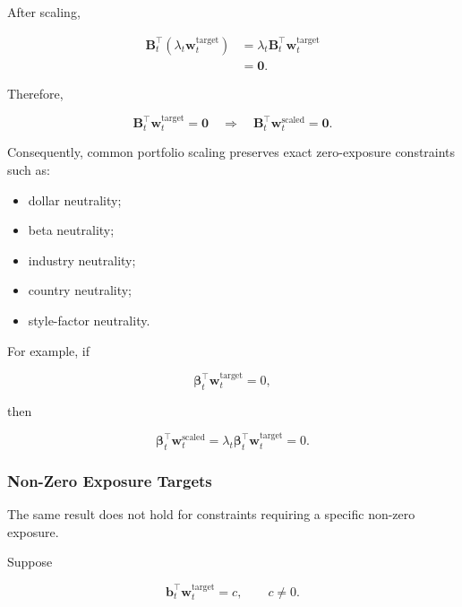 \documentclass[11pt,a4paper]{article}
\begin{document}
After scaling,

\begin{equation}
\begin{aligned}
\mathbf{B}_t^\top
\left(
\lambda_t
\mathbf{w}_t^{\mathrm{target}}
\right)
&=
\lambda_t
\mathbf{B}_t^\top
\mathbf{w}_t^{\mathrm{target}}
\\
&=
\mathbf{0}.
\end{aligned}
\end{equation}

Therefore,

\begin{equation}
\boxed{
\mathbf{B}_t^\top
\mathbf{w}_t^{\mathrm{target}}
=
\mathbf{0}
\quad\Rightarrow\quad
\mathbf{B}_t^\top
\mathbf{w}_t^{\mathrm{scaled}}
=
\mathbf{0}.
}
\end{equation}

Consequently, common portfolio scaling preserves exact zero-exposure
constraints such as:

\begin{itemize}
    \item dollar neutrality;
    \item beta neutrality;
    \item industry neutrality;
    \item country neutrality;
    \item style-factor neutrality.
\end{itemize}

For example, if

\begin{equation}
\boldsymbol{\beta}_t^\top
\mathbf{w}_t^{\mathrm{target}}
=
0,
\end{equation}

then

\begin{equation}
\boldsymbol{\beta}_t^\top
\mathbf{w}_t^{\mathrm{scaled}}
=
\lambda_t
\boldsymbol{\beta}_t^\top
\mathbf{w}_t^{\mathrm{target}}
=
0.
\end{equation}


\subsubsection{Non-Zero Exposure Targets}

The same result does not hold for constraints requiring a specific non-zero
exposure.

Suppose

\begin{equation}
\mathbf{b}_t^\top
\mathbf{w}_t^{\mathrm{target}}
=
c,
\qquad
c\neq0.
\end{equation}
\end{document}
